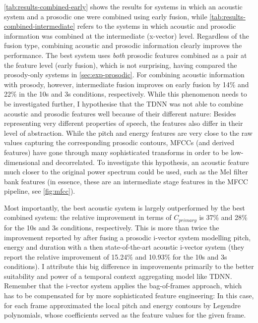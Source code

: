 \documentclass[bsc,frontabs,twoside,singlespacing,parskip,deptreport]{infthesis}
\begin{document}
{{    \autoref{tab:results-combined-early} shows the results for systems in which an acoustic system and a prosodic one were combined using early fusion, while \autoref{tab:results-combined-intermediate} refers to the systems in which acoustic and prosodic information was combined at the intermediate (x-vector) level. Regardless of the fusion type, combining acoustic and prosodic information clearly improves the performance. The best system uses \textit{both} prosodic features combined as a pair at the feature level (early fusion), which is not surprising, having compared the prosody-only systems in \autoref{sec:exp-prosodic}.
    For combining acoustic information with prosody, however, intermediate fusion improves on early fusion by 14\% and 22\% in the 10s and 3s conditions, respectively.
    While this phenomenon needs to be investigated further, I hypothesise that the TDNN was not able to combine acoustic and prosodic features well because of their different nature: Besides representing very different properties of speech, the features also differ in their level of abstraction. While the pitch and energy features are very close to the raw values capturing the corresponding prosodic contours, MFCCs (and derived features) have gone through many sophisticated transforms in order to be low-dimensional and decorrelated. To investigate this hypothesis, an acoustic feature much closer to the original power spectrum could be used, such as the Mel filter bank features (in essence, these are an intermediate stage features in the MFCC pipeline, see \autoref{fig:mfcc}).
    
    Most importantly, the best acoustic system is largely outperformed by the best combined system: the relative improvement in terms of $C_{primary}$ is 37\% and 28\% for the 10s and 3s conditions, respectively. This is more than twice the improvement reported by \citet{Martinez_et_al_2012} after fusing a prosodic i-vector system modelling pitch, energy and duration with a then state-of-the-art acoustic i-vector system (they report the relative improvement of 15.24\% and 10.93\% for the 10s and 3s conditions).
    I attribute this big difference in improvements primarily to the better suitability and power of a temporal context aggregating model like TDNN. Remember that the i-vector system applies the bag-of-frames approach, which has to be compensated for by more sophisticated feature engineering: In this case, \citeauthor{Martinez_et_al_2012} for each frame approximated the local pitch and energy contours by Legendre polynomials, whose coefficients served as the feature values for the given frame.

}}
\end{document}

